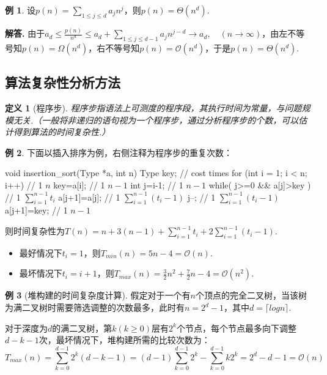 \documentclass[12pt, a4paper, oneside]{ctexart}
\newtheorem{definition}{定义}[section]
\numberwithin{equation}{section}  %
\theoremstyle{definition}
\newtheorem{example}{例}[section]
\newenvironment{solution}[1][]{\par\noindent\textbf{#1解答. }}{\smallskip\par}  %
\let\leq=\leqslant %
\let\geq=\geqslant %
\def\O{\mathcal{O}}         %
\def\add{\vspace{1ex}}      %
\begin{document}
\begin{example}
    设$p(n) = \sum_{1\leq j\leq d}a_jn^j$，则$p(n) = \Theta(n^d)$.
\end{example}
\begin{solution}
    由于$a_d\leq \frac{p(n)}{n^d}\leq a_d+\sum_{1\leq j\leq d-1}a_jn^{j-d}\to a_d,\quad (n\to\infty)$，由左不等号知$p(n) = \Omega(n^d)$，右不等号知$p(n) = \O(n^d)$，于是$p(n) = \Theta(n^d)$.
\end{solution}
\subsection{算法复杂性分析方法}
\begin{definition}[程序步]
    程序步指语法上可测度的程序段，其执行时间为常量，与问题规模无关.（一般将非递归的语句视为一个程序步，通过分析程序步的个数，可以估计得到算法的时间复杂性.）
\end{definition}
\begin{example}
下面以插入排序为例，右侧注释为程序步的重复次数：
\begin{cppcode}
void insertion_sort(Type *a, int n)
{
    Type key;                        //   cost     times
    for (int i = 1; i < n; i++){     //    1        $n$   
        key=a[i];                    //    1        $n-1$ 
        int j=i-1;                   //    1        $n-1$ 
        while( j>=0 && a[j]>key ){   //    1        $\sum_{i=1}^{n-1}t_i$
            a[j+1]=a[j];             //    1        $\sum_{i=1}^{n-1}(t_i-1)$
            j--;                     //    1        $\sum_{i=1}^{n-1}(t_i-1)$
        }
        a[j+1]=key;                  //    1        $n-1$
    }
}
\end{cppcode}
则时间复杂性为$T(n) = n+3(n-1) + \sum_{i=1}^{n-1}t_i + 2\sum_{i=1}^{n-1}(t_i-1)$.
\begin{itemize}
    \item 最好情况下$t_i = 1$，则$T_{min}(n) = 5n-4 = \O(n)$.\add
    \item 最坏情况下$t_i = i+1$，则$T_{max}(n) = \frac{3}{2}n^2+\frac{7}{2}n-4=\O(n^2)$.
\end{itemize}
\end{example}
\begin{example}[堆构建的时间复杂度计算]
    假定对于一个有$n$个顶点的完全二叉树，当该树为满二叉树时需要筛选调整的次数最多，此时有$n=2^d-1$，其中$d=\lceil logn \rceil$.

    对于深度为$d$的满二叉树，第$k(k\geq 0)$层有$2^k$个节点，每个节点最多向下调整$d-k-1$次，最坏情况下，堆构建所需的比较次数为：
    \begin{equation*}
        T_{max}(n) = \sum_{k=0}^{d-1}2^k(d-k-1) =  (d-1)\sum_{k=0}^{d-1}2^k-\sum_{k=0}^{d-1}k2^k = 2^d-d-1 = \O(n)
    \end{equation*}
\end{example}
\end{document}
